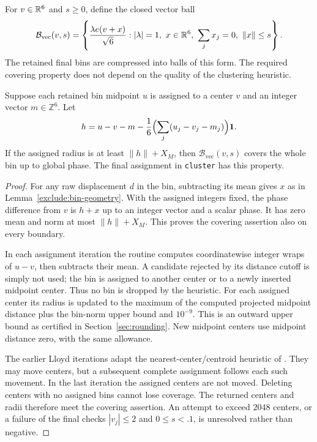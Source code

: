 For $v\in\mathbb R^6$ and $s\ge0$, define the closed vector ball
\begin{equation}
 \mathcal B_{\mathrm{vec}}(v,s)=
 \left\{\frac{\lambda e(v+x)}{\sqrt6}:
       |\lambda|=1,\ x\in\mathbb R^6,\ \sum_jx_j=0,\ \|x\|\le s\right\}.
 \label{exclude:vector-ball}
\end{equation}
The retained final bins are compressed into balls of this form.
The required covering property does not depend on the quality of the
clustering heuristic.

\begin{lemma}
\label{exclude:cluster-cover}
Suppose each retained bin midpoint $u$ is assigned to a center $v$ and
an integer vector $m\in\mathbb Z^6$.  Let
\[
 h=u-v-m-\frac16\Bigl(\sum_j(u_j-v_j-m_j)\Bigr)\mathbf1.
\]
If the assigned radius is at least $\|h\|+X_M$, then
$\mathcal B_{\mathrm{vec}}(v,s)$ covers the whole bin up to global phase.
The final assignment in \texttt{cluster} has this property.
\end{lemma}
\begin{proof}
For any raw displacement $d$ in the bin, subtracting its mean gives
$x$ as in Lemma~\ref{exclude:bin-geometry}.  With the assigned integers
fixed, the phase difference from $v$ is $h+x$ up to an integer vector
and a scalar phase.  It has zero mean and norm at most $\|h\|+X_M$.
This proves the covering assertion also on every boundary.

In each assignment iteration the routine computes coordinatewise
integer wraps of $u-v$, then subtracts their mean.  A candidate rejected
by its distance cutoff is simply not used; the bin is assigned to
another center or to a newly inserted midpoint center.  Thus no bin
is dropped by the heuristic.
For each assigned center its radius is updated to the maximum of the
computed projected midpoint distance plus the bin-norm upper bound
and $10^{-9}$.  This is an outward upper bound as certified in
Section~\ref{sec:rounding}.  New midpoint centers use midpoint
distance zero, with the same allowance.

The earlier Lloyd iterations adapt the nearest-center/centroid heuristic
of \cite[Sections~IV--VI]{Lloyd1982}.  They may move centers, but a subsequent complete
assignment follows each such movement.  In the last iteration the
assigned centers are not moved.  Deleting centers with no assigned
bins cannot lose coverage.  The returned centers and radii therefore
meet the covering assertion.  An attempt to exceed $2048$ centers,
or a failure of the final checks $|v_j|\le2$ and $0\le s<.1$, is
unresolved rather than negative.
\end{proof}

